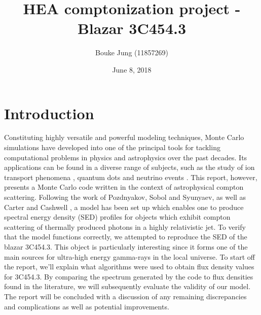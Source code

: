 \documentclass{article}
\title{\textbf{HEA comptonization project - Blazar 3C454.3 }}
\author{Bouke Jung (11857269)}
\date{June 8, 2018}
\begin{document}
 

\maketitle
\tableofcontents


\newpage

\section{Introduction}
    Constituting highly versatile and powerful modeling techniques, Monte Carlo simulations have developed into one of the principal tools for tackling computational problems in physics and astrophysics over the past decades. Its applications can be found in a diverse range of subjects, such as the study of ion transport phenomena \cite{Haggmark1980}, quantum dots \cite{Gull2011} and neutrino events \cite{Andreopoulos2010}. This report, however, presents a Monte Carlo code written in the context of astrophysical compton scattering. Following the work of Pozdnyakov, Sobol and Syunyaev\cite{Pozdnyakov1983}, as well as Carter and Cashwell \cite{Carter1975}, a model has been set up which enables one to produce spectral energy density (SED) profiles for objects which exhibit compton scattering of thermally produced photons in a highly relativistic jet. To verify that the model functions correctly, we attempted to reproduce the SED of the blazar 3C454.3. This object is particularly interesting since it forms one of the main sources for ultra-high energy gamma-rays in the local universe. To start off the report, we'll explain what algorithms were used to obtain flux density values for 3C454.3. By comparing the spectrum generated by the code to flux densities found in the literature, we will subsequently evaluate the validity of our model. The report will be concluded with a discussion of any remaining discrepancies and complications as well as potential improvements.
\end{document}
